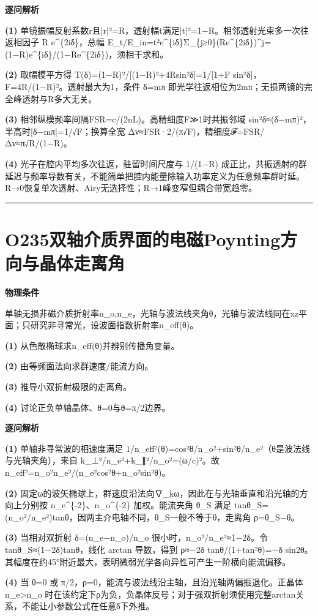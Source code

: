 \documentclass[UTF8,a4paper,11pt,oneside,openany]{ctexbook}
\begin{document}
\par\medskip\noindent\textbf{逐问解析}
\par\noindent\textbf{(1)} 单镜振幅反射系数r且|r|²=R，透射幅t满足|t|²=1−R。相邻透射光束多一次往返相因子 R e\textasciicircum{}\{2iδ\}，总幅 E\_t/E\_in=t²e\textasciicircum{}\{iδ\}Σ\_\{j≥0\}(Re\textasciicircum{}\{2iδ\})\textasciicircum{}j=(1−R)e\textasciicircum{}\{iδ\}/(1−Re\textasciicircum{}\{2iδ\})，须相干求和。
\par\noindent\textbf{(2)} 取幅模平方得 T(δ)=(1−R)²/[(1−R)²+4Rsin²δ]=1/[1+F sin²δ]，F=4R/(1−R)²。透射最大为1，条件 δ=mπ 即光学往返相位为2mπ；无损两镜的完全峰透射与R多大无关。
\par\noindent\textbf{(3)} 相邻纵模频率间隔FSR=c/(2nL)。高精细度F≫1时共振邻域 sin²δ≈(δ−mπ)²，半高时|δ−mπ|=1/√F；换算全宽 Δν≈FSR·2/(π√F)，精细度𝓕=FSR/Δν≈π√R/(1−R)。
\par\noindent\textbf{(4)} 光子在腔内平均多次往返，驻留时间尺度与 1/(1−R) 成正比，共振透射的群延迟与频率导数有关，不能简单把腔内能量除输入功率定义为任意频率群时延。R→0恢复单次透射、Airy无选择性；R→1峰变窄但耦合带宽趋零。

\par\bigskip\hrule\bigskip
\section*{O235\quad 双轴介质界面的电磁Poynting方向与晶体走离角}
\textbf{物理条件}\par 单轴无损非磁介质折射率n\_o,n\_e，光轴与波法线夹角θ，光轴与波法线同在xz平面；只研究非寻常光，设波面指数折射率n\_eff(θ)。
\par\noindent\textbf{(1)} 从色散椭球求n\_eff(θ)并辨别传播角变量。
\par\noindent\textbf{(2)} 由等频面法向求群速度/能流方向。
\par\noindent\textbf{(3)} 推导小双折射极限的走离角。
\par\noindent\textbf{(4)} 讨论正负单轴晶体、θ=0与θ=π/2边界。

\par\medskip\noindent\textbf{逐问解析}
\par\noindent\textbf{(1)} 单轴非寻常波的相速度满足 1/n\_eff²(θ)=cos²θ/n\_o²+sin²θ/n\_e²（θ是波法线与光轴夹角），来自 k\_⊥²/n\_e²+k\_∥²/n\_o²=(ω/c)²。故 n\_eff²=n\_o²n\_e²/(n\_e²cos²θ+n\_o²sin²θ)。
\par\noindent\textbf{(2)} 固定ω的波矢椭球上，群速度沿法向∇\_kω，因此在与光轴垂直和沿光轴的方向上分别按 n\_e\textasciicircum{}\{-2\}、n\_o\textasciicircum{}\{-2\} 加权。能流夹角 θ\_S 满足 tanθ\_S=(n\_o²/n\_e²)tanθ，因两主介电轴不同，θ\_S一般不等于θ，走离角 ρ=θ\_S−θ。
\par\noindent\textbf{(3)} 当相对双折射 δ=(n\_e−n\_o)/n\_o 很小时，n\_o²/n\_e²≈1−2δ。令 tanθ\_S≈(1−2δ)tanθ，线化 arctan 导数，得到 ρ≈−2δ tanθ/(1+tan²θ)=−δ sin2θ。其幅度在约45°附近最大，表明微弱光学各向异性可产生一阶横向能流偏移。
\par\noindent\textbf{(4)} 当 θ=0 或 π/2，ρ=0，能流与波法线沿主轴，且沿光轴两偏振退化。正晶体 n\_e>n\_o 时在该约定下ρ为负，负晶体反号；对于强双折射须使用完整arctan关系，不能让小参数公式在任意δ下外推。
\end{document}
